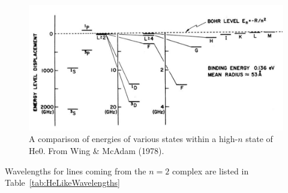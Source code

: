 \begin{figure}
\label{fig:HeEnergiesHighNLevel}
\centering
\includegraphics[scale=0.5]{HeEnergiesHighNLevel}
\caption[Energies within high-n levels of He]{A  comparison of energies of various states within a high-$n$ state
of He0.  From Wing \& McAdam (1978).}
\end{figure}

Wavelengths for lines coming from the $n = 2$ complex are listed in
Table~\ref{tab:HeLikeWavelengths}

